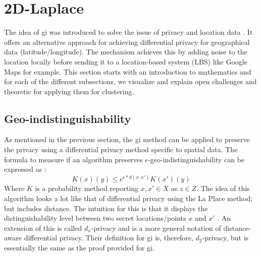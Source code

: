 
\section{2D-Laplace}
The idea of \gls{gi} was introduced to solve the issue of privacy and location data \citep{DBLP:journals/corr/abs-1212-1984}.
It offers an alternative approach for achieving differential privacy for geographical data (latitude/longitude).
The mechanism achieves this by adding noise to the location locally before sending it to a location-based system (LBS) like Google Maps for example.
This section starts with an introduction to mathematics and for each of the different subsections, we visualize and explain open challenges and theoretic for applying them for clustering.
\subsection*{Geo-indistinguishability}
As mentioned in the previous section, the \gls{gi} method can be applied to preserve the privacy using a differential privacy method specific to spatial data.
The formula to measure if an algorithm preserves $\epsilon$-geo-indistinguishability can be expressed as \citep{DBLP:journals/corr/abs-1212-1984}:
\begin{equation}
  K(x)(y) \le e^{\epsilon * d(x,x')} K(x')(y)
  \label{algo:2d-geo-indistinguishability}
\end{equation}
Where $K$ is a probability method reporting $x, x' \in X$ as $z \in Z$.
The idea of this algorithm looks a lot like that of differential privacy using the La Place method; but includes distance.
The intuition for this is that it displays the distinguishability level between two secret locations/points $x$ and $x'$ \citep{chatzikokolakis_constructing_2015}.
An extension of this is called $d_x$-privacy and is a more general notation of distance-aware differential privacy.
Their definition for \gls{gi} is, therefore, $d_2$-privacy, but is essentially the same as the proof provided for \gls{gi}.

